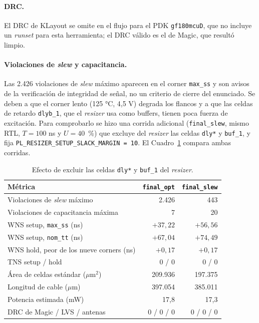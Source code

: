 \documentclass[11pt,letterpaper]{article}
\newcommand{\code}[1]{\texttt{#1}}
\newcommand{\fuente}{\par\vspace{3pt}{\footnotesize\emph{Fuente: Elaboración propia.}}\par}
\begin{document}
\paragraph{DRC.} El DRC de KLayout se omite en el flujo para el PDK \code{gf180mcuD}, que no incluye un \textit{runset} para esta herramienta; el DRC válido es el de Magic, que resultó limpio.

\paragraph{Violaciones de \textit{slew} y capacitancia.} Las 2.426 violaciones de \textit{slew} máximo aparecen en el corner \code{max\_ss} y son avisos de la verificación de integridad de señal, no un criterio de cierre del enunciado. Se deben a que el corner lento (125 °C, 4,5 V) degrada los flancos y a que las celdas de retardo \code{dlyb\_1}, que el \textit{resizer} usa como buffers, tienen poca fuerza de excitación. Para comprobarlo se hizo una corrida adicional (\code{final\_slew}, mismo RTL, $T=100$ ns y $U=40$~\%) que excluye del \textit{resizer} las celdas \code{dly*} y \code{buf\_1}, y fija \code{PL\_RESIZER\_SETUP\_SLACK\_MARGIN = 10}. El Cuadro~\ref{tab:slew} compara ambas corridas.

\begin{table}[H]
\centering
\caption{Efecto de excluir las celdas \code{dly*} y \code{buf\_1} del \textit{resizer}.}
\label{tab:slew}
\begin{tabular}{lrr}
\toprule
\textbf{Métrica} & \textbf{\code{final\_opt}} & \textbf{\code{final\_slew}}\\
\midrule
Violaciones de \textit{slew} máximo & 2.426 & 443\\
Violaciones de capacitancia máxima & 7 & 20\\
WNS setup, \code{max\_ss} (ns) & $+37{,}22$ & $+56{,}56$\\
WNS setup, \code{nom\_tt} (ns) & $+67{,}04$ & $+74{,}49$\\
WNS hold, peor de los nueve corners (ns) & $+0{,}17$ & $+0{,}17$\\
TNS setup / hold & 0 / 0 & 0 / 0\\
Área de celdas estándar ($\mu$m$^2$) & 209.936 & 197.375\\
Longitud de cable ($\mu$m) & 397.054 & 385.011\\
Potencia estimada (mW) & 17,8 & 17,3\\
DRC de Magic / LVS / antenas & 0 / 0 / 0 & 0 / 0 / 0\\
\bottomrule
\end{tabular}
\fuente
\end{table}
\end{document}
